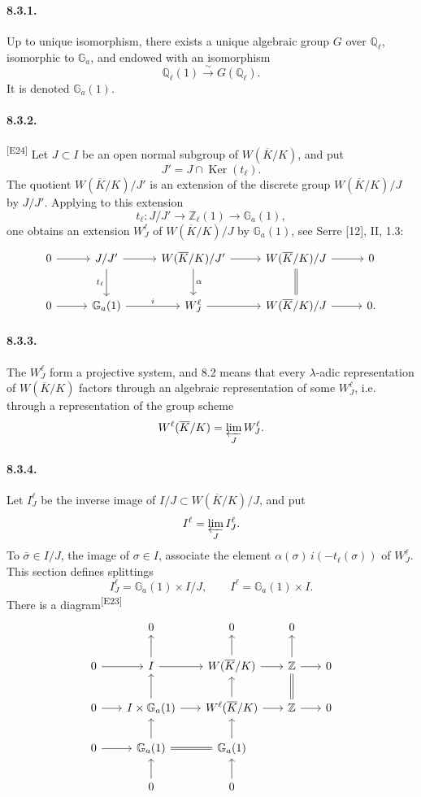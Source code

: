 \documentclass[10pt,letterpaper]{article}
\newcommand{\Z}{\mathbb Z}
\newcommand{\iso}{\xrightarrow{\sim}}
\providecommand{\Ker}{\operatorname{Ker}}
\providecommand{\Ker}{\operatorname{Ker}}
\newcommand{\auditmark}[1]{\textsuperscript{\normalfont\scriptsize[E#1]}}
\begin{document}
\paragraph{8.3.1.} Up to unique isomorphism, there exists a unique algebraic group \(G\) over \(\mathbb Q_\ell\), isomorphic to \(\mathbb G_a\), and endowed with an isomorphism
\[
\mathbb Q_\ell(1)\iso G(\mathbb Q_\ell).
\]
It is denoted \(\mathbb G_a(1)\).

\paragraph{8.3.2.}\auditmark{24} Let \(J\subset I\) be an open normal subgroup of \(W(\overline K/K)\), and put
\[
J'=J\cap\Ker(t_\ell).
\]
The quotient \(W(\overline K/K)/J'\) is an extension of the discrete group \(W(\overline K/K)/J\) by \(J/J'\). Applying to this extension
\[
t_\ell:J/J'\longrightarrow\mathbb Z_\ell(1)\longrightarrow\mathbb G_a(1),
\]
one obtains an extension \(W_J^\ell\) of \(W(\overline K/K)/J\) by \(\mathbb G_a(1)\), see Serre [12], II, 1.3:
\[
\begin{tikzcd}[column sep=2.7em,row sep=2.3em]
0 \arrow[r] & J/J' \arrow[r] \arrow[d,"t_\ell"'] &
W(\overline K/K)/J' \arrow[r] \arrow[d,"\alpha"] &
W(\overline K/K)/J \arrow[r] \arrow[d,equal] & 0\\
0 \arrow[r] & \mathbb G_a(1) \arrow[r,"i"] &
W_J^\ell \arrow[r] &
W(\overline K/K)/J \arrow[r] & 0 .
\end{tikzcd}
\]

\paragraph{8.3.3.} The \(W_J^\ell\) form a projective system, and 8.2 means that every \(\lambda\)-adic representation of \(W(\overline K/K)\) factors through an algebraic representation of some \(W_J^\ell\), i.e. through a representation of the group scheme
\[
W^\ell(\overline K/K)=\varprojlim_J W_J^\ell.
\]

\paragraph{8.3.4.} Let \(I_J^\ell\) be the inverse image of \(I/J\subset W(\overline K/K)/J\), and put
\[
I^\ell=\varprojlim_J I_J^\ell.
\]
To \(\bar\sigma\in I/J\), the image of \(\sigma\in I\), associate the element \(\alpha(\sigma)\,i(-t_\ell(\sigma))\) of \(W_J^\ell\). This section defines splittings
\[
I_J^\ell=\mathbb G_a(1)\times I/J,
\qquad
I^\ell=\mathbb G_a(1)\times I.
\]
There is a diagram\auditmark{23}
\[
\begin{tikzcd}[column sep=1.8em,row sep=1.8em]
& 0 & 0 & 0 & \\
0 \arrow[r] & I \arrow[r] \arrow[u] & W(\overline K/K) \arrow[r] \arrow[u] & \Z \arrow[r] \arrow[u] & 0\\
0 \arrow[r] & I\times\mathbb G_a(1) \arrow[r] \arrow[u] & W^\ell(\overline K/K) \arrow[r] \arrow[u] & \Z \arrow[r] \arrow[u,equal] & 0\\
0 \arrow[r] & \mathbb G_a(1) \arrow[r,equal] \arrow[u] & \mathbb G_a(1) \arrow[u] & &\\
& 0 \arrow[u] & 0 \arrow[u] & &
\end{tikzcd}
\]
\end{document}
